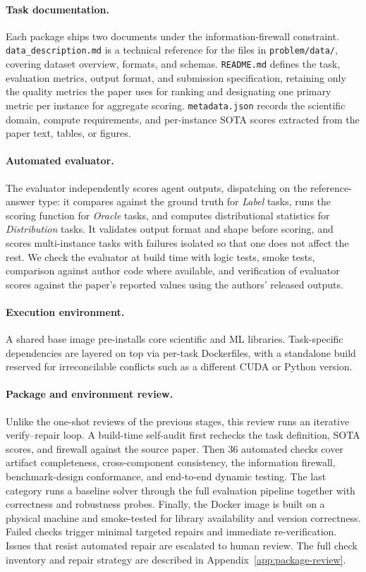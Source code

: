 \documentclass{llmxive}
\begin{document}
\paragraph{Task documentation.}
Each package ships two documents under the information-firewall constraint. \texttt{data\_description.md} is a technical reference for the files in \texttt{problem/data/}, covering dataset overview, formats, and schemas. \texttt{README.md} defines the task, evaluation metrics, output format, and submission specification, retaining only the quality metrics the paper uses for ranking and designating one primary metric per instance for aggregate scoring.
\texttt{metadata.json} records the scientific domain, compute requirements, and per-instance SOTA scores extracted from the paper text, tables, or figures.

\paragraph{Automated evaluator.}
The evaluator independently scores agent outputs, dispatching on the reference-answer type: it compares against the ground truth for \emph{Label} tasks, runs the scoring function for \emph{Oracle} tasks, and computes distributional statistics for \emph{Distribution} tasks. It validates output format and shape before scoring, and scores multi-instance tasks with failures isolated so that one does not affect the rest. We check the evaluator at build time with logic tests, smoke tests, comparison against author code where available, and verification of evaluator scores against the paper's reported values using the authors' released outputs.

\paragraph{Execution environment.}
A shared base image pre-installs core scientific and ML libraries. Task-specific dependencies are layered on top via per-task Dockerfiles, with a standalone build reserved for irreconcilable conflicts such as a different CUDA or Python version.

\paragraph{Package and environment review.}
Unlike the one-shot reviews of the previous stages, this review runs an iterative verify--repair loop.
A build-time self-audit first rechecks the task definition, SOTA scores, and firewall against the source paper.
Then 36 automated checks cover artifact completeness, cross-component consistency, the information firewall, benchmark-design conformance, and end-to-end dynamic testing. The last category runs a baseline solver through the full evaluation pipeline together with correctness and robustness probes.
Finally, the Docker image is built on a physical machine and smoke-tested for library availability and version correctness.
Failed checks trigger minimal targeted repairs and immediate re-verification. Issues that resist automated repair are escalated to human review.
The full check inventory and repair strategy are described in Appendix~\ref{app:package-review}.
\end{document}

